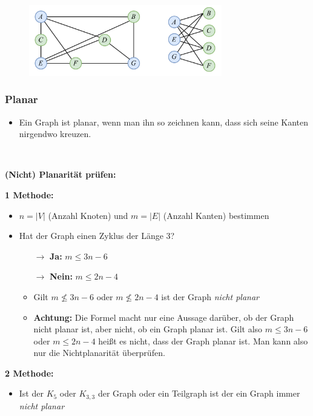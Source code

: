 \begin{figure}[h]
\centering
\includegraphics[width=0.75\textwidth]{graphics/graph_bipartit2.png}
\end{figure}

\subsubsection*{Planar}

\begin{itemize}
\item Ein Graph ist planar, wenn man ihn so zeichnen kann, dass sich seine Kanten nirgendwo kreuzen.
\end{itemize}\

\textbf{(Nicht) Planarität prüfen:}

\textbf{1 Methode:}

\begin{itemize}
\item $n = |V|$ (Anzahl Knoten) und $m = |E|$ (Anzahl Kanten) bestimmen
\item Hat der Graph einen Zyklus der Länge 3?
	\begin{itemize}
	\item[$\rightarrow$] \textbf{Ja:} $m \leq 3n - 6$
	\item[$\rightarrow$] \textbf{Nein:} $m \leq 2n - 4$
	\item Gilt $m \not \leq 3n - 6$ oder $m \not \leq 2n - 4$ ist der Graph \textit{nicht planar}
	\item \textbf{Achtung:} Die Formel macht nur eine Aussage darüber, ob der Graph nicht planar ist, aber nicht, ob ein Graph planar ist. Gilt also $m \leq 3n - 6$ oder $m \leq 2n - 4$ heißt es nicht, dass der Graph planar ist. Man kann also nur die Nichtplanarität überprüfen.
	\end{itemize}
\end{itemize}

\textbf{2 Methode:}

\begin{itemize}
\item Ist der $K_5$ oder $K_{3,3}$ der Graph oder ein Teilgraph ist der ein Graph immer \textit{nicht planar}
\end{itemize}

